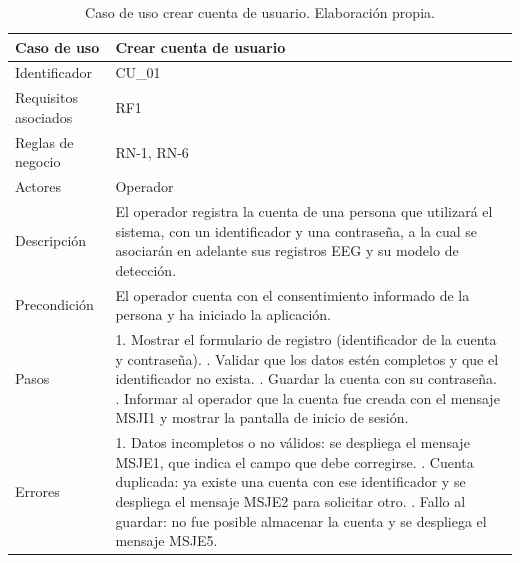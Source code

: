 \begin{table}[H]
\centering
\small
\begin{tabularx}{\textwidth}{|L{3.0cm}|Y|}
\hline
\textbf{Caso de uso} & \textbf{Crear cuenta de usuario} \\
\hline
Identificador & CU\_01 \\
\hline
Requisitos asociados & RF1 \\
\hline
Reglas de negocio & RN-1, RN-6 \\
\hline
Actores & Operador \\
\hline
Descripción & El operador registra la cuenta de una persona que utilizará el sistema, con un identificador y una contraseña, a la cual se asociarán en adelante sus registros EEG y su modelo de detección. \\
\hline
Precondición & El operador cuenta con el consentimiento informado de la persona y ha iniciado la aplicación. \\
\hline
Pasos & 1. Mostrar el formulario de registro (identificador de la cuenta y contraseña). . Validar que los datos estén completos y que el identificador no exista. . Guardar la cuenta con su contraseña. . Informar al operador que la cuenta fue creada con el mensaje MSJI1 y mostrar la pantalla de inicio de sesión. \\
\hline
Errores & 1. Datos incompletos o no válidos: se despliega el mensaje MSJE1, que indica el campo que debe corregirse. . Cuenta duplicada: ya existe una cuenta con ese identificador y se despliega el mensaje MSJE2 para solicitar otro. . Fallo al guardar: no fue posible almacenar la cuenta y se despliega el mensaje MSJE5. \\
\hline
\end{tabularx}
\caption{Caso de uso crear cuenta de usuario. Elaboración propia.}
\label{tab:cu01}
\end{table}

